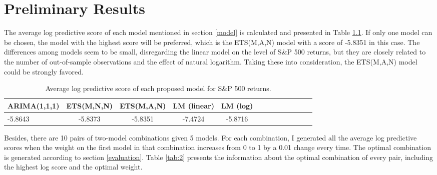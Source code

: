 \documentclass{monashthesis}
\begin{document}
\hypertarget{preliminary-results}{%
\chapter{Preliminary Results}\label{preliminary-results}}

The average log predictive score of each model mentioned in section \ref{model} is calculated and presented in Table \ref{tab:1}. If only one model can be chosen, the model with the highest score will be preferred, which is the ETS(M,A,N) model with a score of -5.8351 in this case. The differences among models seem to be small, disregarding the linear model on the level of S\&P 500 returns, but they are closely related to the number of out-of-sample observations and the effect of natural logarithm. Taking these into consideration, the ETS(M,A,N) model could be strongly favored.

\vspace{0.3cm}

\begin{table}[htbp!]
\centering
\caption{Average log predictive score of each proposed model for S\&P 500 returns.}
\begin{tabular}{l*{4}{c}cccccccc}
\hline
     ARIMA(1,1,1) & ETS(M,N,N) & ETS(M,A,N) & LM (linear) & LM (log) \\
    \hline
     -5.8643 & -5.8373  & -5.8351 & -7.4724 & -5.8716\\
    \hline
\end{tabular}
\label{tab:1}
\end{table}

\vspace{0.3cm}

Besides, there are 10 pairs of two-model combinations given 5 models. For each combination, I generated all the average log predictive scores when the weight on the first model in that combination increases from 0 to 1 by a 0.01 change every time. The optimal combination is generated according to section \ref{evaluation}. Table \ref{tab:2} presents the information about the optimal combination of every pair, including the highest log score and the optimal weight.

\vspace{0.3cm}
\end{document}
